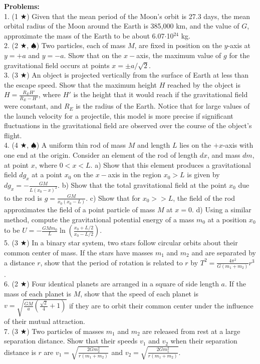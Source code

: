 \noindent\textbf{Problems:}\\
1. (1 $\bigstar$) Given that the mean period of the Moon's orbit is 27.3 days, the mean orbital radius of the Moon around the Earth is 385,000 km, and the value of $G$, approximate the mass of the Earth to be about 6.07$\cdot$10$^{24}$ kg. \\
2. (2 $\bigstar$, $\spadesuit$) Two particles, each of mass $M$, are fixed in position on the $y$-axis at $y = +a$ and $y = -a$. Show that on the $x-$axis, the maximum value of $g$ for the gravitational field occurs at points $x = \pm a/\sqrt{2}$. \\
3. (3 $\bigstar$) An object is projected vertically from the surface of Earth at less than the escape speed. Show that the maximum height $H$ reached by the object is $H = \frac{R_EH'}{R_E - H'}$, where $H'$ is the height that it would reach if the gravitational field were constant, and $R_E$ is the radius of the Earth. Notice that for large values of the launch velocity for a projectile, this model is more precise if significant fluctuations in the gravitational field are observed over the course of the object's flight.\\
4. (4 $\bigstar$, $\spadesuit$) A uniform thin rod of mass $M$ and length $L$ lies on the $+x$-axis with one end at the origin. Consider an element of the rod of length $dx$, and mass $dm$, at point $x$, where $0<x<L$. a) Show that this element produces a gravitational field $dg_{x}$ at a point $x_0$ on the $x-$axis in the region $x_0 > L$ is given by $dg_{x} = -\frac{GM}{L(x_0-x)^2}$. b) Show that the total gravitational field at the point $x_0$ due to the rod is $g = \frac{GM}{x_0(x_0-L)}$. c) Show that for $x_0 >> L$, the field of the rod approximates the field of a point particle of mass $M$ at $x = 0$. d) Using a similar method, compute the gravitational potential energy of a mass $m_0$ at a position $x_0$ to be $U = -\frac{GMm_0}{L} \ln\left(\frac{x_0+L/2}{x_0-L/2}\right)$.\\
5. (3 $\bigstar$) In a binary star system, two stars follow circular orbits about their common center of mass. If the stars have masses $m_1$ and $m_2$ and are separated by a distance $r$, show that the period of rotation is related to $r$ by $T^2 = \frac{4\pi^2}{G(m_1+m_2)}r^3$. \\
6. (2 $\bigstar$) Four identical planets are arranged in a square of side length $a$. If the mass of each planet is $M$, show that the speed of each planet is $v = \sqrt{\frac{GM}{a}\left(\frac{\sqrt{2}}{4} + 1 \right)}$ if they are to orbit their common center under the influence of their mutual attraction.\\
7. (3 $\bigstar$) Two particles of masses $m_1$ and $m_2$ are released from rest at a large separation distance. Show that their speeds $v_1$ and $v_2$ when their separation distance is $r$ are $v_1 = \sqrt{\frac{2Gm_2^2}{r(m_1+m_2)}}$ and $v_2 = \sqrt{\frac{2Gm_1^2}{r(m_1+m_2)}}$.
\pagebreak
